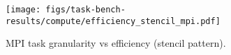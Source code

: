 \begin{figure}[t]
\centering
\texttt{[image: figs/task-bench-results/compute/efficiency\_stencil\_mpi.pdf]}
\caption{MPI task granularity vs efficiency (stencil pattern).\label{fig:efficiency-mpi}}
\end{figure}
